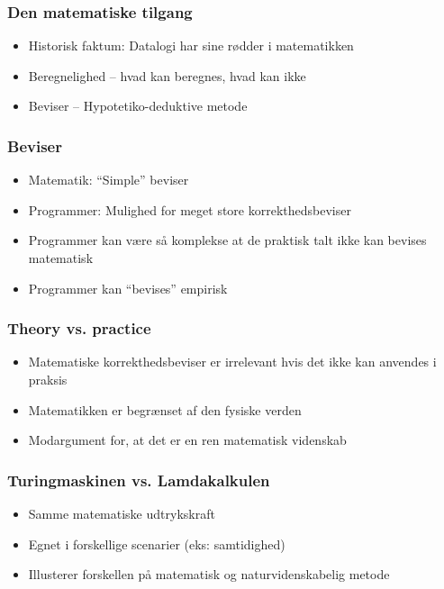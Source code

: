 \documentclass{beamer}
\begin{document}
\begin{frame}
\frametitle{Den matematiske tilgang}
\begin{itemize}
    \item Historisk faktum: Datalogi har sine rødder i matematikken
    \item Beregnelighed -- hvad kan beregnes, hvad kan ikke
    \item Beviser -- Hypotetiko-deduktive metode
\end{itemize}
\end{frame}

\begin{frame}
\frametitle{Beviser}
\begin{itemize}
    \item Matematik: ``Simple'' beviser
    \item Programmer: Mulighed for meget store korrekthedsbeviser
    \item Programmer kan være så komplekse at de praktisk talt ikke kan bevises
    matematisk
    \item Programmer kan ``bevises'' empirisk
\end{itemize}
\end{frame}

\begin{frame}
\frametitle{Theory vs. practice}
\begin{itemize}
    \item Matematiske korrekthedsbeviser er irrelevant hvis det ikke kan
    anvendes i praksis
    \item Matematikken er begrænset af den fysiske verden
    \item Modargument for, at det er en ren matematisk videnskab
\end{itemize}
\end{frame}

\begin{frame}
\frametitle{Turingmaskinen vs. Lamdakalkulen}
\begin{itemize}
    \item Samme matematiske udtrykskraft
    \item Egnet i forskellige scenarier (eks: samtidighed)
    \item Illusterer forskellen på matematisk og naturvidenskabelig metode
\end{itemize}
\end{frame}
\end{document}
